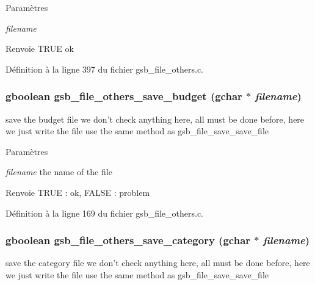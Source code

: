 \begin{DoxyParams}{Paramètres}
\item[{\em filename}]\end{DoxyParams}
\begin{DoxyReturn}{Renvoie}
TRUE ok 
\end{DoxyReturn}


Définition à la ligne 397 du fichier gsb\_\-file\_\-others.c.

\subsubsection[{gsb\_\-file\_\-others\_\-save\_\-budget}]{\setlength{\rightskip}{0pt plus 5cm}gboolean gsb\_\-file\_\-others\_\-save\_\-budget (gchar $\ast$ {\em filename})}\label{gsb__file__others_8h_a4abd0499f3d53596ab95c19c2196e34b}
save the budget file we don't check anything here, all must be done before, here we just write the file use the same method as gsb\_\-file\_\-save\_\-save\_\-file


\begin{DoxyParams}{Paramètres}
\item[{\em filename}]the name of the file\end{DoxyParams}
\begin{DoxyReturn}{Renvoie}
TRUE : ok, FALSE : problem 
\end{DoxyReturn}


Définition à la ligne 169 du fichier gsb\_\-file\_\-others.c.

\subsubsection[{gsb\_\-file\_\-others\_\-save\_\-category}]{\setlength{\rightskip}{0pt plus 5cm}gboolean gsb\_\-file\_\-others\_\-save\_\-category (gchar $\ast$ {\em filename})}\label{gsb__file__others_8h_a464a0f4acc3ce957fe2987d86c4e8f3e}
save the category file we don't check anything here, all must be done before, here we just write the file use the same method as gsb\_\-file\_\-save\_\-save\_\-file


